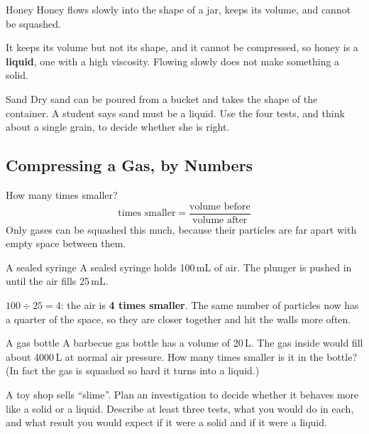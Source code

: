 \begin{workedex}{Honey}
Honey flows slowly into the shape of a jar, keeps its volume, and cannot be squashed.

\smallskip
It keeps its volume but not its shape, and it cannot be compressed, so honey is a \textbf{liquid}, one with a high viscosity. Flowing slowly does not make something a solid.
\end{workedex}

\begin{wedo}{Sand}
Dry sand can be poured from a bucket and takes the shape of the container. A student says sand must be a liquid. Use the four tests, and think about a single grain, to decide whether she is right.
\answerbox{5cm}
\end{wedo}

\subsection{Compressing a Gas, by Numbers}\label{sub:a1.2}

\begin{skillbox}{How many times smaller?}
\[ \text{times smaller} = \frac{\text{volume before}}{\text{volume after}} \]
Only gases can be squashed this much, because their particles are far apart with empty space between them.
\end{skillbox}

\begin{workedex}{A sealed syringe}
A sealed syringe holds 100\,mL of air. The plunger is pushed in until the air fills 25\,mL.

\smallskip
$100 \div 25 = 4$: the air is \textbf{4 times smaller}. The same number of particles now has a quarter of the space, so they are closer together and hit the walls more often.
\end{workedex}

\begin{wedo}{A gas bottle}
A barbecue gas bottle has a volume of 20\,L. The gas inside would fill about 4000\,L at normal air pressure. How many times smaller is it in the bottle? (In fact the gas is squashed so hard it turns into a liquid.)
\workbox{4cm}
\end{wedo}

\label{prac:1}


\label{ext:1}

\task A toy shop sells ``slime''. Plan an investigation to decide whether it behaves more like a solid or a liquid. Describe at least three tests, what you would do in each, and what result you would expect if it were a solid and if it were a liquid.
\answerbox{9cm}

